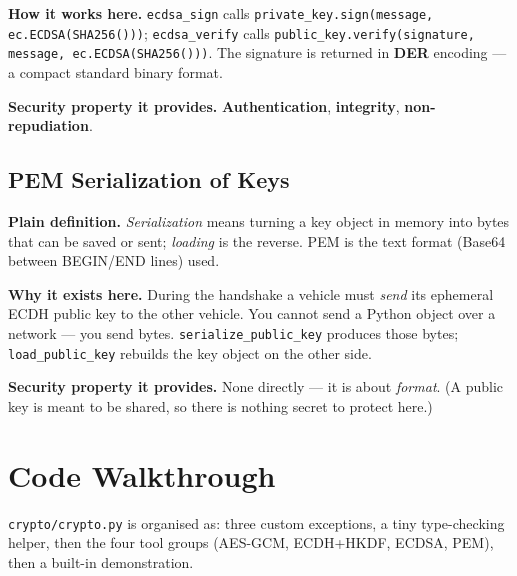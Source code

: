 \documentclass[11pt,a4paper]{article}
\begin{document}
\textbf{How it works here.} \texttt{ecdsa\_sign} calls
\texttt{private\_key.sign(message, ec.ECDSA(SHA256()))}; \texttt{ecdsa\_verify}
calls \texttt{public\_key.verify(signature, message, ec.ECDSA(SHA256()))}. The
signature is returned in \textbf{DER} encoding --- a compact standard binary
format.

\textbf{Security property it provides.} \textbf{Authentication},
\textbf{integrity}, \textbf{non-repudiation}.

\subsection{PEM Serialization of Keys}
\textbf{Plain definition.} \emph{Serialization} means turning a key object in
memory into bytes that can be saved or sent; \emph{loading} is the reverse. PEM
is the text format (Base64 between BEGIN/END lines) used.

\textbf{Why it exists here.} During the handshake a vehicle must \emph{send} its
ephemeral ECDH public key to the other vehicle. You cannot send a Python object
over a network --- you send bytes. \texttt{serialize\_public\_key} produces those
bytes; \texttt{load\_public\_key} rebuilds the key object on the other side.

\textbf{Security property it provides.} None directly --- it is about
\emph{format}. (A public key is meant to be shared, so there is nothing secret to
protect here.)

\section{Code Walkthrough}

\texttt{crypto/crypto.py} is organised as: three custom exceptions, a tiny
type-checking helper, then the four tool groups (AES-GCM, ECDH+HKDF, ECDSA, PEM),
then a built-in demonstration.
\end{document}

